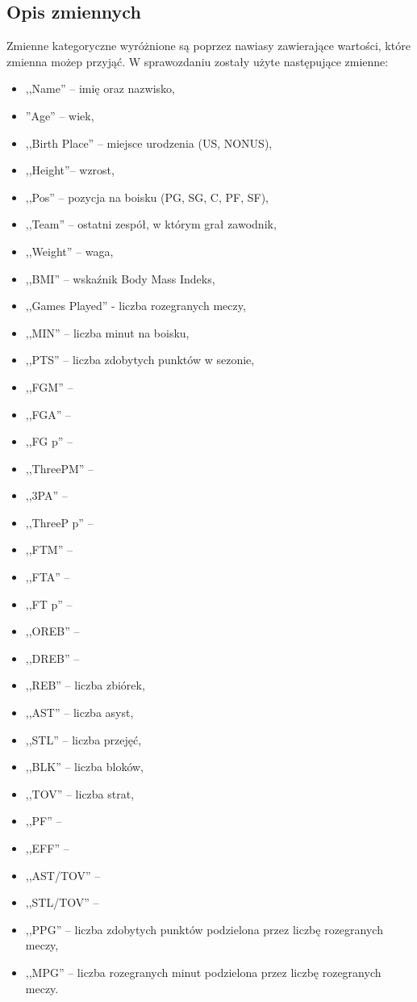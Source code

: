 \documentclass[11pt,a4paper]{article}
\begin{document}
\subsection{Opis zmiennych}
Zmienne kategoryczne wyróżnione są poprzez nawiasy zawierające wartości, które zmienna możep przyjąć. W sprawozdaniu zostały użyte następujące zmienne:
\begin{itemize}
	\item ,,Name'' -- imię oraz nazwisko,
	\item ''Age'' -- wiek,
	\item ,,Birth Place'' -- miejsce urodzenia (US, NONUS),
	\item ,,Height''-- wzrost,
	\item ,,Pos'' -- pozycja na boisku (PG, SG, C, PF, SF),
	\item ,,Team'' -- ostatni zespół, w którym grał zawodnik,
	\item ,,Weight'' -- waga,	
	\item ,,BMI'' -- wskaźnik Body Mass Indeks, 
	\item ,,Games Played'' - liczba rozegranych meczy,	
	\item ,,MIN'' -- liczba minut na boisku,
	\item ,,PTS'' -- liczba zdobytych punktów w sezonie,
	\item ,,FGM'' -- 
	\item ,,FGA'' -- 
	\item ,,FG p'' -- 
	\item ,,ThreePM'' -- 
	\item ,,3PA'' -- 
	\item ,,ThreeP p'' -- 
	\item ,,FTM'' -- 
	\item ,,FTA'' -- 
	\item ,,FT p'' -- 
	\item ,,OREB'' -- 	
	\item ,,DREB'' -- 	
	\item ,,REB'' -- liczba zbiórek,
	\item ,,AST'' -- liczba asyst,
	\item ,,STL'' -- liczba przejęć,
	\item ,,BLK'' -- liczba bloków,
	\item ,,TOV'' -- liczba strat,
	\item ,,PF'' --
	\item ,,EFF'' -- 
	\item ,,AST/TOV'' -- 
	\item ,,STL/TOV'' -- 
	\item ,,PPG'' -- liczba zdobytych punktów podzielona przez liczbę rozegranych meczy,
	\item ,,MPG'' -- liczba rozegranych minut podzielona przez liczbę rozegranych meczy.
\end{itemize}
\end{document}
